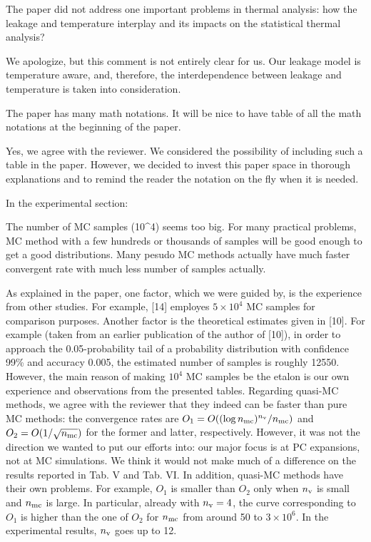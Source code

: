 \begin{reviewer}
The paper did not address one important problems in thermal analysis: how the leakage and temperature interplay and its impacts on the statistical thermal analysis?
\end{reviewer}
\begin{authors}
We apologize, but this comment is not entirely clear for us.
Our leakage model is temperature aware, and, therefore, the interdependence between leakage and temperature is taken into consideration.
\end{authors}

\begin{reviewer}
The paper has many math notations. It will be nice to have table of all the math notations at the beginning of  the paper.
\end{reviewer}
\begin{authors}
Yes, we agree with the reviewer.
We considered the possibility of including such a table in the paper.
However, we decided to invest this paper space in thorough explanations and to remind the reader the notation on the fly when it is needed.
\end{authors}

\begin{reviewer}
In the experimental section:

The number of MC samples (10\^{}4) seems too big. For many practical problems, MC method with a few hundreds or thousands of samples will be good enough to get a good distributions. Many pesudo MC methods actually have much faster convergent rate with much less number of samples actually.
\end{reviewer}
\begin{authors}
As explained in the paper, one factor, which we were guided by, is the experience from other studies.
For example, [14] employes $5 \times 10^4$ MC samples for comparison purposes.
Another factor is the theoretical estimates given in [10].
For example (taken from an earlier publication of the author of [10]), in order to approach the 0.05-probability tail of a probability distribution with confidence 99\% and accuracy 0.005, the estimated number of samples is roughly 12550.
However, the main reason of making $10^4$ MC samples be the etalon is our own experience and observations from the presented tables.
Regarding quasi-MC methods, we agree with the reviewer that they indeed can be faster than pure MC methods: the convergence rates are $O_1 = O((\log{n_\text{mc}})^{n_\text{v}} / {n_\text{mc}})$ and $O_2 = O(1 / \sqrt{{n_\text{mc}}})$ for the former and latter, respectively.
However, it was not the direction we wanted to put our efforts into: our major focus is at PC expansions, not at MC simulations.
We think it would not make much of a difference on the results reported in Tab. V and Tab. VI.
In addition, quasi-MC methods have their own problems.
For example, $O_1$ is smaller than $O_2$ only when ${n_\text{v}}$ is small and ${n_\text{mc}}$ is large.
In particular, already with ${n_\text{v}} = 4$, the curve corresponding to $O_1$ is higher than the one of $O_2$ for ${n_\text{mc}}$ from around 50 to $3 \times 10^6$.
In the experimental results, ${n_\text{v}}$ goes up to 12.
\end{authors}

